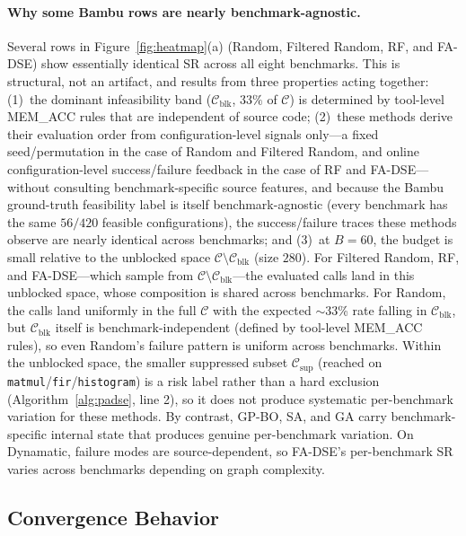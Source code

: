 \documentclass[journal]{IEEEtran}
\begin{document}
\paragraph{Why some Bambu rows are nearly benchmark-agnostic.} Several rows in Figure~\ref{fig:heatmap}(a) (Random, Filtered Random, RF, and FA-DSE) show essentially identical SR across all eight benchmarks. This is structural, not an artifact, and results from three properties acting together: (1)~the dominant infeasibility band ($\mathcal{C}_{\text{blk}}$, $33\%$ of $\mathcal{C}$) is determined by tool-level MEM\_ACC rules that are independent of source code; (2)~these methods derive their evaluation order from configuration-level signals only---a fixed seed/permutation in the case of Random and Filtered Random, and online configuration-level success/failure feedback in the case of RF and FA-DSE---without consulting benchmark-specific source features, and because the Bambu ground-truth feasibility label is itself benchmark-agnostic (every benchmark has the same $56/420$ feasible configurations), the success/failure traces these methods observe are nearly identical across benchmarks; and (3)~at $B{=}60$, the budget is small relative to the unblocked space $\mathcal{C} \setminus \mathcal{C}_{\text{blk}}$ (size $280$). For Filtered Random, RF, and FA-DSE---which sample from $\mathcal{C} \setminus \mathcal{C}_{\text{blk}}$---the evaluated calls land in this unblocked space, whose composition is shared across benchmarks. For Random, the calls land uniformly in the full $\mathcal{C}$ with the expected $\sim$33\% rate falling in $\mathcal{C}_{\text{blk}}$, but $\mathcal{C}_{\text{blk}}$ itself is benchmark-independent (defined by tool-level MEM\_ACC rules), so even Random's failure pattern is uniform across benchmarks. Within the unblocked space, the smaller suppressed subset $\mathcal{C}_{\text{sup}}$ (reached on \texttt{matmul}/\texttt{fir}/\texttt{histogram}) is a risk label rather than a hard exclusion (Algorithm~\ref{alg:padse}, line 2), so it does not produce systematic per-benchmark variation for these methods. By contrast, GP-BO, SA, and GA carry benchmark-specific internal state that produces genuine per-benchmark variation. On Dynamatic, failure modes are source-dependent, so FA-DSE's per-benchmark SR varies across benchmarks depending on graph complexity.

\subsection{Convergence Behavior}
\label{sec:convergence}
\end{document}
